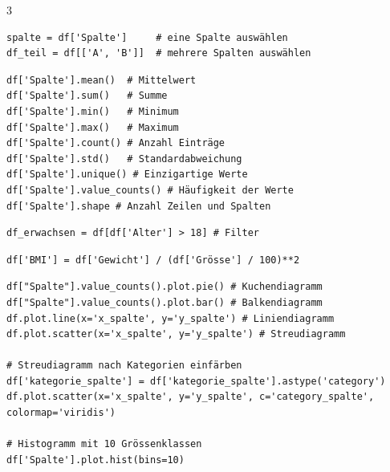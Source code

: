 \begin{landscape}
\begin{multicols*}{3}
		\begin{cheatSheetBox}[title=Spalten auswählen]
			\begin{lstlisting}
spalte = df['Spalte']     # eine Spalte auswählen
df_teil = df[['A', 'B']]  # mehrere Spalten auswählen
\end{lstlisting}
		\end{cheatSheetBox}

		\begin{cheatSheetBox}[title=Tabellen-Statistiken]
			\begin{lstlisting}
df['Spalte'].mean()  # Mittelwert
df['Spalte'].sum()   # Summe
df['Spalte'].min()   # Minimum
df['Spalte'].max()   # Maximum
df['Spalte'].count() # Anzahl Einträge
df['Spalte'].std()   # Standardabweichung
df['Spalte'].unique() # Einzigartige Werte
df['Spalte'].value_counts() # Häufigkeit der Werte
df['Spalte'].shape # Anzahl Zeilen und Spalten
\end{lstlisting}

		\end{cheatSheetBox}

		\begin{cheatSheetBox}[title=Zeilen filtern]
			\begin{lstlisting}
df_erwachsen = df[df['Alter'] > 18] # Filter 
\end{lstlisting}
		\end{cheatSheetBox}

		\begin{cheatSheetBox}[title=Neue Spalte erstellen]
			\begin{lstlisting}
df['BMI'] = df['Gewicht'] / (df['Grösse'] / 100)**2
\end{lstlisting}
		\end{cheatSheetBox}

		\begin{cheatSheetBox}[title=Grafiken erstellen]
			\begin{lstlisting}
df["Spalte"].value_counts().plot.pie() # Kuchendiagramm
df["Spalte"].value_counts().plot.bar() # Balkendiagramm
df.plot.line(x='x_spalte', y='y_spalte') # Liniendiagramm
df.plot.scatter(x='x_spalte', y='y_spalte') # Streudiagramm

# Streudiagramm nach Kategorien einfärben
df['kategorie_spalte'] = df['kategorie_spalte'].astype('category') 
df.plot.scatter(x='x_spalte', y='y_spalte', c='category_spalte', colormap='viridis')

# Histogramm mit 10 Grössenklassen
df['Spalte'].plot.hist(bins=10)


\end{lstlisting}
\end{cheatSheetBox}
\end{multicols*}
\end{landscape}

